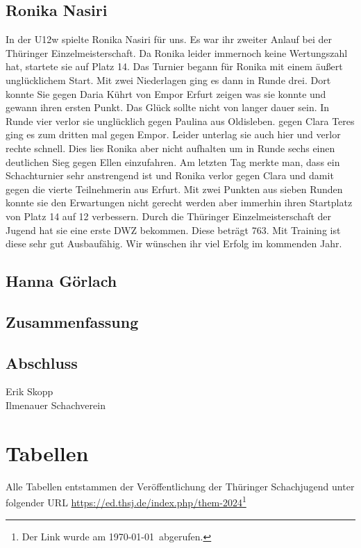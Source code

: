 \documentclass[a4paper,ngerman]{tui-algo-seminar}
\begin{document}
\subsection{Ronika Nasiri}
In der U12w spielte Ronika Nasiri für uns. Es war ihr zweiter Anlauf bei der Thüringer Einzelmeisterschaft. Da Ronika leider immernoch keine Wertungszahl hat, startete sie auf Platz 14. Das Turnier begann für Ronika mit einem äußert unglücklichem Start. Mit zwei Niederlagen ging es dann in Runde drei. Dort konnte Sie gegen Daria Kührt von Empor Erfurt zeigen was sie konnte und gewann ihren ersten Punkt. Das Glück sollte nicht von langer dauer sein.  In Runde vier verlor sie unglücklich gegen Paulina aus Oldisleben. gegen Clara Teres ging es zum dritten mal gegen Empor. Leider unterlag sie auch hier und verlor rechte schnell. Dies lies Ronika aber nicht aufhalten um in Runde sechs einen deutlichen Sieg gegen Ellen einzufahren. Am letzten Tag merkte man, dass ein Schachturnier sehr anstrengend ist und Ronika verlor gegen Clara und damit gegen die vierte Teilnehmerin aus Erfurt. 
Mit zwei Punkten aus sieben Runden konnte sie den Erwartungen nicht gerecht werden aber immerhin ihren Startplatz von Platz 14 auf 12 verbessern. Durch die Thüringer Einzelmeisterschaft der Jugend hat sie eine erste DWZ bekommen. Diese beträgt 763. Mit Training ist diese sehr gut Ausbaufähig. Wir wünschen ihr viel Erfolg im kommenden Jahr.  


\subsection{Hanna Görlach}



\subsection{Zusammenfassung}


\subsection{Abschluss}



\vspace{2cm}
Erik Skopp\\
Ilmenauer Schachverein\\
\clearpage


\section{Tabellen}
Alle Tabellen entstammen der Veröffentlichung der Thüringer Schachjugend unter folgender URL \url{https://ed.thsj.de/index.php/them-2024}\footnote{Der Link wurde am \today ~abgerufen.}
\end{document}
